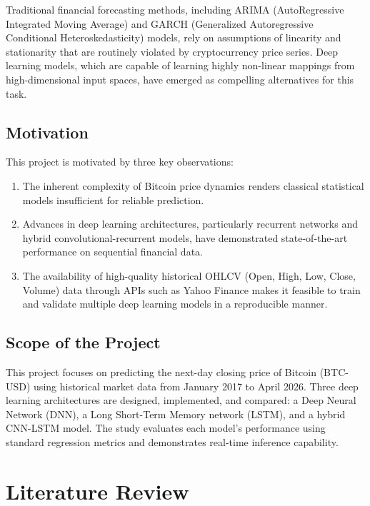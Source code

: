 \documentclass[12pt]{article}
\begin{document}
Traditional financial forecasting methods, including ARIMA (AutoRegressive Integrated Moving Average) and GARCH (Generalized Autoregressive Conditional Heteroskedasticity) models, rely on assumptions of linearity and stationarity that are routinely violated by cryptocurrency price series. Deep learning models, which are capable of learning highly non-linear mappings from high-dimensional input spaces, have emerged as compelling alternatives for this task.

\subsection{Motivation}

This project is motivated by three key observations:
\begin{enumerate}[leftmargin=*]
    \item The inherent complexity of Bitcoin price dynamics renders classical statistical models insufficient for reliable prediction.
    \item Advances in deep learning architectures, particularly recurrent networks and hybrid convolutional-recurrent models, have demonstrated state-of-the-art performance on sequential financial data.
    \item The availability of high-quality historical OHLCV (Open, High, Low, Close, Volume) data through APIs such as Yahoo Finance makes it feasible to train and validate multiple deep learning models in a reproducible manner.
\end{enumerate}

\subsection{Scope of the Project}

This project focuses on predicting the next-day closing price of Bitcoin (BTC-USD) using historical market data from January 2017 to April 2026. Three deep learning architectures are designed, implemented, and compared: a Deep Neural Network (DNN), a Long Short-Term Memory network (LSTM), and a hybrid CNN-LSTM model. The study evaluates each model's performance using standard regression metrics and demonstrates real-time inference capability.

\section{Literature Review}
\end{document}
